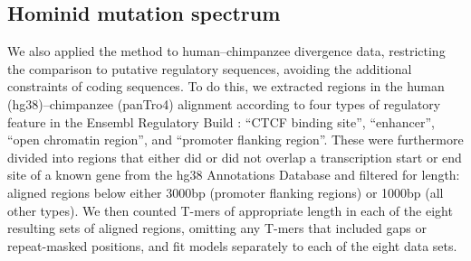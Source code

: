 \documentclass{article}
\theoremstyle{plain}
\theoremstyle{definition}
\begin{document}
\subsection{Hominid mutation spectrum}

We also applied the method to human--chimpanzee divergence data,
restricting the comparison to putative regulatory sequences,
avoiding the additional constraints of coding sequences.
To do this, we extracted regions in the human (hg38)--chimpanzee (panTro4) alignment %
according to four types of regulatory feature in the Ensembl Regulatory Build \citep[release 81][]{zerbino2015ensembl}:
``CTCF binding site'', ``enhancer'', ``open chromatin region'', and ``promoter flanking region''.
These were furthermore divided into regions that either did or did not overlap a transcription start or end site of a known gene
from the hg38 Annotations Database \citep{kent2002human}
and filtered for length:
aligned regions below either 3000bp (promoter flanking regions) or 1000bp (all other types).
We then counted T-mers of appropriate length in each of the eight resulting sets of aligned regions, omitting any T-mers that included gaps or repeat-masked positions,
and fit models separately to each of the eight data sets.
\end{document}

